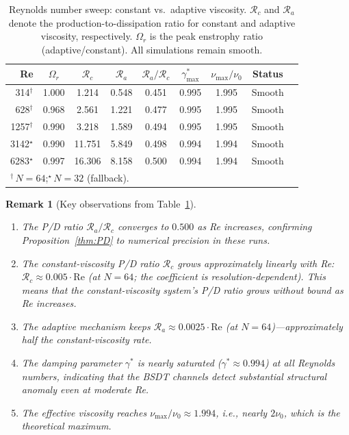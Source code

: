\documentclass[12pt, a4paper]{article}
\newtheorem{remark}[theorem]{Remark}
\newcommand{\gammastar}{\gamma^*}
\begin{document}
\begin{table}[H]
\centering
\caption{Reynolds number sweep: constant vs.~adaptive viscosity.
$\mathcal{R}_c$ and $\mathcal{R}_a$ denote the production-to-dissipation
ratio for constant and adaptive viscosity, respectively.
$\Omega_r$ is the peak enstrophy ratio (adaptive/constant).
All simulations remain smooth.}
\label{tab:re_sweep}
\begin{tabular}{@{}rcccccccc@{}}
\toprule
Re & $\Omega_r$ & $\mathcal{R}_c$ & $\mathcal{R}_a$
& $\mathcal{R}_a/\mathcal{R}_c$
& $\gammastar_{\max}$ & $\nu_{\max}/\nu_0$ & Status \\
\midrule
314$^\dag$   & 1.000  & 1.214  & 0.548  & 0.451  & 0.995 & 1.995 & Smooth \\
628$^\dag$   & 0.968  & 2.561  & 1.221  & 0.477  & 0.995 & 1.995 & Smooth \\
1257$^\dag$  & 0.990  & 3.218  & 1.589  & 0.494  & 0.995 & 1.995 & Smooth \\
3142$^\star$ & 0.990  & 11.751 & 5.849  & 0.498  & 0.994 & 1.994 & Smooth \\
6283$^\star$ & 0.997  & 16.306 & 8.158  & 0.500  & 0.994 & 1.994 & Smooth \\
\bottomrule
\multicolumn{8}{l}{\footnotesize $^\dag$\,$N = 64$;\quad $^\star$\,$N = 32$ (fallback).}
\end{tabular}
\end{table}

\begin{remark}[Key observations from Table~\ref{tab:re_sweep}]
\mbox{}
\begin{enumerate}
\item The P/D ratio $\mathcal{R}_a/\mathcal{R}_c$ converges to
  $\mathbf{0.500}$ as Re increases, confirming
  Proposition~\ref{thm:PD} to numerical precision in these runs.

\item The constant-viscosity P/D ratio $\mathcal{R}_c$ grows
  approximately \emph{linearly} with Re:
  $\mathcal{R}_c \approx 0.005 \cdot \mathrm{Re}$ (at $N = 64$;
  the coefficient is resolution-dependent).
  This means that the constant-viscosity
  system's P/D ratio grows without bound as Re increases.

\item The adaptive mechanism keeps
  $\mathcal{R}_a \approx 0.0025 \cdot \mathrm{Re}$ (at $N = 64$)---approximately
  half the constant-viscosity rate.

\item The damping parameter $\gammastar$ is nearly saturated
  ($\gammastar \approx 0.994$) at all Reynolds numbers, indicating
  that the BSDT channels detect substantial structural anomaly
  even at moderate Re.

\item The effective viscosity reaches $\nu_{\max}/\nu_0 \approx 1.994$,
  i.e., nearly $2\nu_0$, which is the theoretical maximum.
\end{enumerate}
\end{remark}
\end{document}
